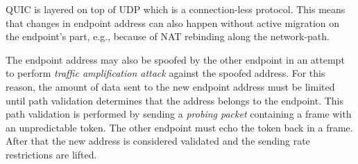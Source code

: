 QUIC is layered on top of UDP which is a connection-less protocol. This means that changes in
endpoint address can also happen without active migration on the endpoint's part, e.g., because of
NAT rebinding along the \gls{network-path}.

The endpoint address may also be spoofed by the other endpoint in an attempt to perform
\textit{traffic amplification attack} against the spoofed address. For this reason, the amount of
data sent to the new endpoint address must be limited until path validation determines that the
address belongs to the endpoint. This path validation is performed by sending a \textit{probing
  packet} containing a \PATHCHALLENGE{} frame with an unpredictable token. The other endpoint must
echo the token back in a \PATHRESPONSE{} frame. After that the new address is considered validated
and the sending rate restrictions are lifted.
